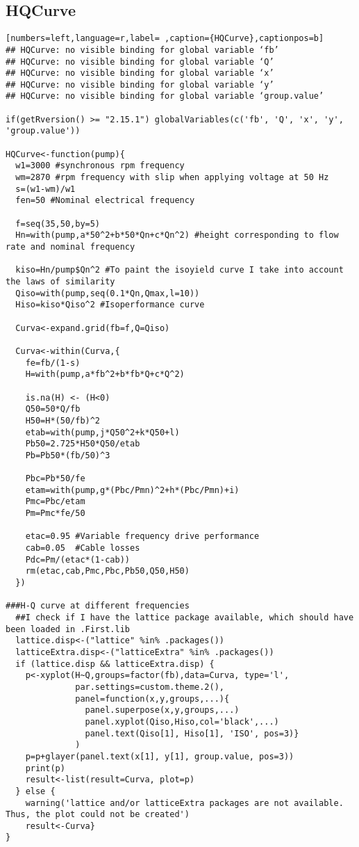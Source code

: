 \subsection{HQCurve}
\label{sec:orgb56c76d}
\label{subsec:hqcurve}
\begin{lstlisting}[numbers=left,language=r,label= ,caption={HQCurve},captionpos=b]
## HQCurve: no visible binding for global variable ‘fb’
## HQCurve: no visible binding for global variable ‘Q’
## HQCurve: no visible binding for global variable ‘x’
## HQCurve: no visible binding for global variable ‘y’
## HQCurve: no visible binding for global variable ‘group.value’

if(getRversion() >= "2.15.1") globalVariables(c('fb', 'Q', 'x', 'y', 'group.value'))

HQCurve<-function(pump){
  w1=3000 #synchronous rpm frequency
  wm=2870 #rpm frequency with slip when applying voltage at 50 Hz
  s=(w1-wm)/w1
  fen=50 #Nominal electrical frequency

  f=seq(35,50,by=5)
  Hn=with(pump,a*50^2+b*50*Qn+c*Qn^2) #height corresponding to flow rate and nominal frequency

  kiso=Hn/pump$Qn^2 #To paint the isoyield curve I take into account the laws of similarity
  Qiso=with(pump,seq(0.1*Qn,Qmax,l=10))
  Hiso=kiso*Qiso^2 #Isoperformance curve

  Curva<-expand.grid(fb=f,Q=Qiso)

  Curva<-within(Curva,{
    fe=fb/(1-s)
    H=with(pump,a*fb^2+b*fb*Q+c*Q^2)

    is.na(H) <- (H<0)
    Q50=50*Q/fb
    H50=H*(50/fb)^2
    etab=with(pump,j*Q50^2+k*Q50+l)
    Pb50=2.725*H50*Q50/etab
    Pb=Pb50*(fb/50)^3

    Pbc=Pb*50/fe
    etam=with(pump,g*(Pbc/Pmn)^2+h*(Pbc/Pmn)+i)
    Pmc=Pbc/etam
    Pm=Pmc*fe/50

    etac=0.95 #Variable frequency drive performance
    cab=0.05  #Cable losses
    Pdc=Pm/(etac*(1-cab))
    rm(etac,cab,Pmc,Pbc,Pb50,Q50,H50)
  })

###H-Q curve at different frequencies
  ##I check if I have the lattice package available, which should have been loaded in .First.lib
  lattice.disp<-("lattice" %in% .packages())
  latticeExtra.disp<-("latticeExtra" %in% .packages())
  if (lattice.disp && latticeExtra.disp) {
    p<-xyplot(H~Q,groups=factor(fb),data=Curva, type='l',
              par.settings=custom.theme.2(),
              panel=function(x,y,groups,...){
                panel.superpose(x,y,groups,...)
                panel.xyplot(Qiso,Hiso,col='black',...)
                panel.text(Qiso[1], Hiso[1], 'ISO', pos=3)}
              )
    p=p+glayer(panel.text(x[1], y[1], group.value, pos=3))
    print(p)
    result<-list(result=Curva, plot=p)
  } else {
    warning('lattice and/or latticeExtra packages are not available. Thus, the plot could not be created')
    result<-Curva}
}
\end{lstlisting}
